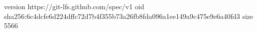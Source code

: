 version https://git-lfs.github.com/spec/v1
oid sha256:6c4dcfe6d224dffc72d7b4f355b73a26fb8fda096a1ee149a9c475e9e6a40fd3
size 5566
